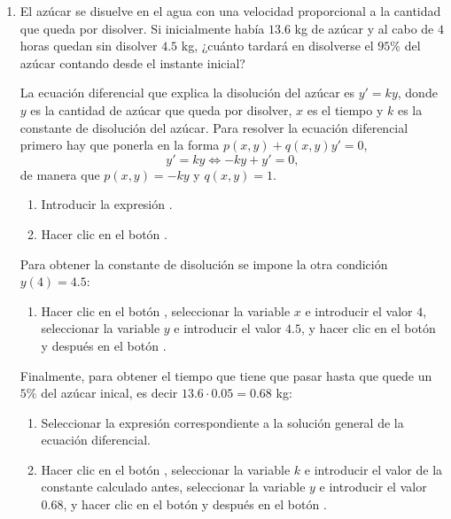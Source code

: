 \begin{enumerate}[leftmargin=*]
\item El azúcar se disuelve en el agua con una velocidad proporcional a la cantidad que queda por disolver.
Si inicialmente había $13.6$ kg de azúcar y al cabo de $4$ horas quedan sin disolver $4.5$ kg, ¿cuánto tardará en disolverse el $95\%$ del
azúcar contando desde el instante inicial?
\begin{indication}
La ecuación diferencial que explica la disolución del azúcar es $y'=ky$, donde $y$ es la cantidad de azúcar que queda
por disolver, $x$ es el tiempo y $k$ es la constante de disolución del azúcar. 
Para resolver la ecuación diferencial primero hay que ponerla en la forma $p(x,y)+q(x,y)y'=0$,
\[
y'=ky \Leftrightarrow -ky+y'=0,
\]
de manera que $p(x,y)=-ky$ y $q(x,y)=1$.
\begin{enumerate}
\item Introducir la expresión .
\item Hacer clic en el botón .
\end{enumerate}
Para obtener la constante de disolución se impone la otra condición $y(4)=4.5$:
\begin{enumerate}[resume]
\item Hacer clic en el botón , seleccionar la variable $x$ e introducir el valor $4$, seleccionar la
variable $y$ e introducir el valor $4.5$, y hacer clic en el botón  y después en el botón
.
\end{enumerate}
Finalmente, para obtener el tiempo que tiene que pasar hasta que quede un $5\%$ del azúcar inical, es decir $13.6\cdot
0.05=0.68$ kg:
\begin{enumerate}[resume]
\item Seleccionar la expresión correspondiente a la solución general de la ecuación diferencial.
\item Hacer clic en el botón , seleccionar la variable $k$ e introducir el valor de la constante calculado antes,
seleccionar la variable $y$ e introducir el valor $0.68$, y hacer clic en el botón  y después en el botón
.
\end{enumerate}
\end{indication}

\end{enumerate}


